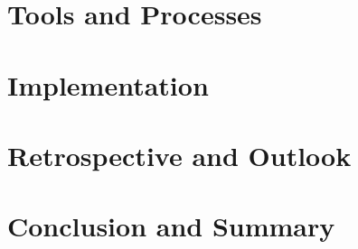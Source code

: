 \documentclass{clbthesis}
\begin{document}
\chapter{Tools and Processes}					


\chapter{Implementation}						


\chapter{Retrospective and Outlook} 			
%

\chapter{Conclusion and Summary}				
%



\cleardoublepage
{}
{}\listoffigures

\listoftables


\appendix



% 
\end{document}
